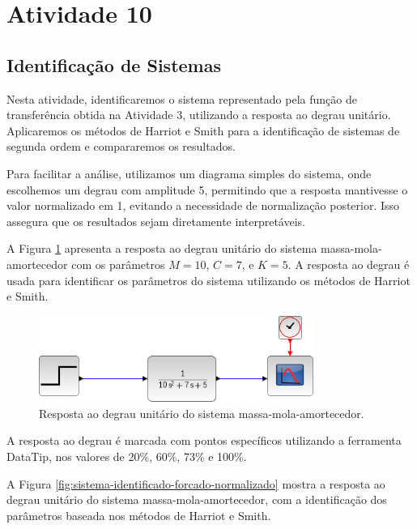 \section{Atividade 10}

\subsection{Identificação de Sistemas}

Nesta atividade, identificaremos o sistema representado pela função de transferência obtida na Atividade 3, utilizando a resposta ao degrau unitário. Aplicaremos os métodos de Harriot e Smith para a identificação de sistemas de segunda ordem e compararemos os resultados.

Para facilitar a análise, utilizamos um diagrama simples do sistema, onde escolhemos um degrau com amplitude 5, permitindo que a resposta mantivesse o valor normalizado em 1, evitando a necessidade de normalização posterior. Isso assegura que os resultados sejam diretamente interpretáveis.

A Figura \ref{fig:diagrama-sistema} apresenta a resposta ao degrau unitário do sistema massa-mola-amortecedor com os parâmetros \(M = 10\), \(C = 7\), e \(K = 5\). A resposta ao degrau é usada para identificar os parâmetros do sistema utilizando os métodos de Harriot e Smith.

\begin{figure}[h]
    \centering
    \includegraphics[width=0.8\textwidth]{atividades/10-atividade/assets/diagrama-sistema.png}
    \caption{Resposta ao degrau unitário do sistema massa-mola-amortecedor.}
    \label{fig:diagrama-sistema}
\end{figure}

A resposta ao degrau é marcada com pontos específicos utilizando a ferramenta DataTip, nos valores de 20\%, 60\%, 73\% e 100\%.

A Figura \ref{fig:sistema-identificado-forcado-normalizado} mostra a resposta ao degrau unitário do sistema massa-mola-amortecedor, com a identificação dos parâmetros baseada nos métodos de Harriot e Smith.

